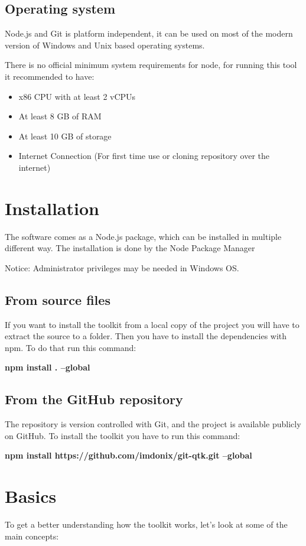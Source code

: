 \subsection{Operating system}
Node.js and Git is platform independent, it can be used on most of the modern version of Windows and Unix based operating systems.\newline

There is no official minimum system requirements for node, for running this tool it recommended to have:

\begin{itemize}
	\item x86 CPU with at least 2 vCPUs
	\item At least 8 GB of RAM
	\item At least 10 GB of storage  
	\item Internet Connection (For first time use or cloning repository over the internet)
\end{itemize}


\section{Installation}
The software comes as a Node.js package, which can be installed in multiple different way. 
The installation is done by the Node Package Manager 

Notice: Administrator privileges may be needed in Windows OS.

\subsection{From source files}
If you want to install the toolkit from a local copy of the project you will have to extract the source to a folder. 
Then you have to install the dependencies with npm.
To do that run this command:

\textbf{npm install . --global}

\subsection{From the GitHub repository}
The repository is version controlled with Git, and the project is available publicly on GitHub. 
To install the toolkit you have to run this command:

\textbf{npm install https://github.com/imdonix/git-qtk.git --global}

\section{Basics}
To get a better understanding how the toolkit works, let’s look at some of the main concepts:

